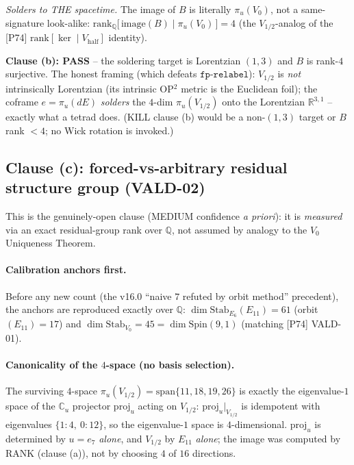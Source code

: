 \emph{Solders to THE spacetime.} The image of $B$ is literally $\pi_u(V_0)$, not a
same-signature look-alike:
$\mathrm{rank}_{\mathbb{Q}}\big[\,\mathrm{image}(B)\mid \pi_u(V_0)\,\big]=4$ (the
$V_{1/2}$-analog of the [P74] $\mathrm{rank}[\ker\mid V_{\text{half}}]$ identity).

\textbf{Clause (b): PASS} -- the soldering target is Lorentzian $(1,3)$ and $B$ is
rank-$4$ surjective. The honest framing (which defeats $\mathtt{fp\text{-}relabel}$):
$V_{1/2}$ is \emph{not} intrinsically Lorentzian (its intrinsic OP$^2$ metric is the
Euclidean foil); the coframe $e=\pi_u(dE)$ \emph{solders} the $4$-dim $\pi_u(V_{1/2})$
onto the Lorentzian $\mathbb{R}^{3,1}$ -- exactly what a tetrad does. (KILL clause (b)
would be a non-$(1,3)$ target or $B$ rank $<4$; no Wick rotation is invoked.)

\subsection{Clause (c): forced-vs-arbitrary residual structure group (VALD-02)}

This is the genuinely-open clause (MEDIUM confidence \emph{a priori}): it is
\emph{measured} via an exact residual-group rank over $\mathbb{Q}$, not assumed by
analogy to the $V_0$ Uniqueness Theorem.

\paragraph{Calibration anchors first.} Before any new count (the v16.0 ``naive $7$
refuted by orbit method'' precedent), the anchors are reproduced exactly over
$\mathbb{Q}$: $\dim\mathrm{Stab}_{E_6}(E_{11})=61$ (orbit$(E_{11})=17$) and
$\dim\mathrm{Stab}_{V_0}=45=\dim\mathrm{Spin}(9,1)$ (matching [P74] VALD-01).

\paragraph{Canonicality of the $4$-space (no basis selection).} The surviving $4$-space
$\pi_u(V_{1/2})=\mathrm{span}\{11,18,19,26\}$ is exactly the eigenvalue-$1$ space of
the $\mathbb{C}_u$ projector $\mathrm{proj}_u$ acting on $V_{1/2}$: $\mathrm{proj}_u|_{V_{1/2}}$
is idempotent with eigenvalues $\{1\!:\!4,\ 0\!:\!12\}$, so the eigenvalue-$1$ space
is $4$-dimensional. $\mathrm{proj}_u$ is determined by $u=e_7$ \emph{alone}, and
$V_{1/2}$ by $E_{11}$ \emph{alone}; the image was computed by RANK (clause (a)), not by
choosing $4$ of $16$ directions.

